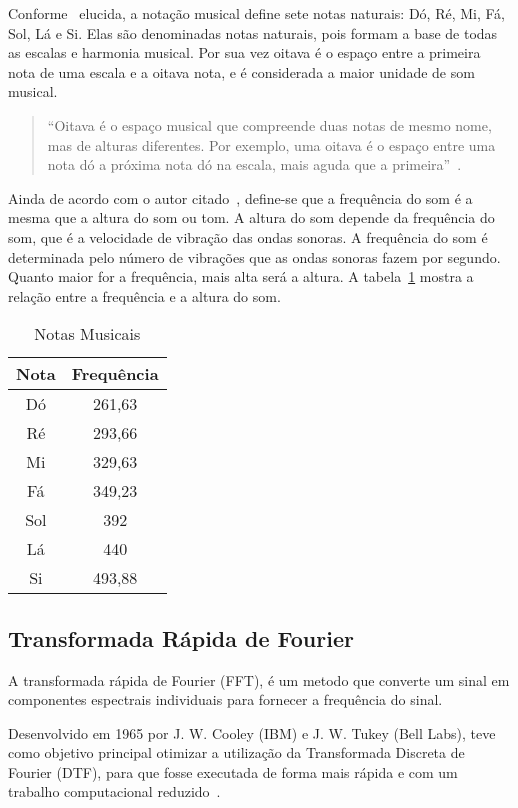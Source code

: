 \documentclass{sbrt}
\begin{document}
Conforme~\cite{moretti2003prototipo} elucida, a notação musical define sete notas naturais: Dó, Ré, Mi, Fá, Sol, Lá e
Si. Elas são denominadas notas naturais, pois formam a base de todas as escalas e harmonia musical. Por sua vez oitava é
o espaço entre a primeira nota de uma escala e a oitava nota, e é considerada a maior unidade de som musical.

\begin{quote}
  ``Oitava é o espaço musical que compreende duas notas de mesmo nome, mas de alturas diferentes. Por exemplo, uma
  oitava é o espaço entre uma nota dó a próxima nota dó na escala, mais aguda que a
  primeira''~\cite{moretti2003prototipo}.
\end{quote}

Ainda de acordo com o autor citado~\cite{moretti2003prototipo}, define-se que a frequência do som é a mesma que a altura do som ou tom. A altura do
som depende da frequência do som, que é a velocidade de vibração das ondas sonoras. A frequência do som é determinada
pelo número de vibrações que as ondas sonoras fazem por segundo. Quanto maior for a frequência, mais alta será a
altura. A tabela~\ref{tab:freq} mostra a relação entre a frequência e a altura do som.

\begin{table}[h]
  \centering
  \caption{\label{tab:freq} Notas Musicais}
  \vspace{-0.2cm}
  \begin{tabular}{c c}
    Nota & Frequência \\
    \hline
    Dó   & 261,63     \\
    Ré   & 293,66     \\
    Mi   & 329,63     \\
    Fá   & 349,23     \\
    Sol  & 392        \\
    Lá   & 440        \\
    Si   & 493,88
  \end{tabular}
\end{table}

\subsection{Transformada Rápida de Fourier}

A transformada rápida de Fourier (FFT), é um metodo que  converte um sinal em componentes espectrais individuais para
fornecer a frequência do sinal.

Desenvolvido em 1965 por  J. W. Cooley (IBM) e J. W. Tukey (Bell Labs), teve como objetivo principal otimizar a
utilização da Transformada Discreta de Fourier (DTF), para que fosse executada de forma mais rápida e com um trabalho
computacional reduzido~\cite{martins2016analise}.
\end{document}
